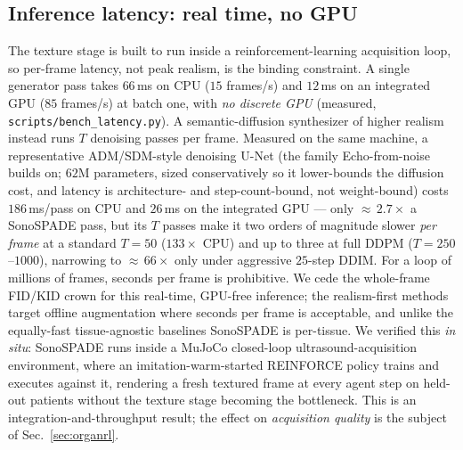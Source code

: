 \documentclass[runningheads]{llncs}
\begin{document}
\subsection{Inference latency: real time, no GPU}
\label{sec:latency}
The texture stage is built to run inside a reinforcement-learning acquisition loop, so per-frame
latency, not peak realism, is the binding constraint. A single generator pass takes $66$\,ms on CPU
($15$ frames/s) and $12$\,ms on an integrated GPU ($85$ frames/s) at batch one, with \emph{no discrete
GPU} (measured, \texttt{scripts/bench\_latency.py}). A semantic-diffusion synthesizer of higher realism
instead runs $T$ denoising passes per frame. Measured on the same machine, a representative ADM/SDM-style
denoising U-Net (the family Echo-from-noise~\cite{stojanovski2023echofromnoise} builds on; $62$M
parameters, sized conservatively so it lower-bounds the diffusion cost, and latency is architecture- and
step-count-bound, not weight-bound) costs $186$\,ms/pass on CPU and $26$\,ms on the integrated GPU ---
only ${\approx}\,2.7\times$ a SonoSPADE pass, but its $T$ passes make it two orders of magnitude slower
\emph{per frame} at a standard $T{=}50$ ($133\times$ CPU) and up to three at full DDPM ($T{=}250$--$1000$),
narrowing to ${\approx}\,66\times$ only under aggressive $25$-step DDIM.
For a loop of millions of frames, seconds per frame is prohibitive. We cede the whole-frame FID/KID crown
for this real-time, GPU-free inference; the realism-first
methods~\cite{vitale2025realism,stojanovski2023echofromnoise} target offline augmentation where seconds
per frame is acceptable, and unlike the equally-fast tissue-agnostic baselines SonoSPADE is per-tissue.
We verified this \emph{in situ}: SonoSPADE runs inside a MuJoCo closed-loop ultrasound-acquisition environment,
where an imitation-warm-started REINFORCE policy trains and executes against it, rendering a fresh
textured frame at every agent step on held-out patients without the texture stage becoming the
bottleneck. This is an integration-and-throughput result; the effect on \emph{acquisition quality} is
the subject of Sec.~\ref{sec:organrl}.
\end{document}
